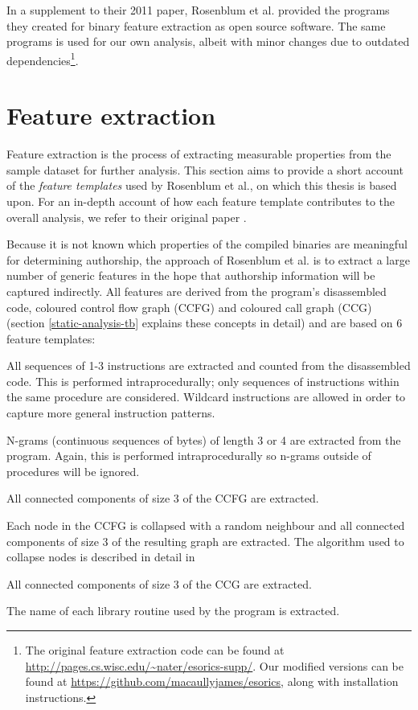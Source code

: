 \documentclass[a4paper,11pt]{kth-mag}
\begin{document}
In a supplement to their 2011 paper, Rosenblum et al. provided the programs
they created for binary feature extraction as open source software. The same programs is used for our own analysis, albeit with minor changes due to
outdated dependencies\footnote{
    The original feature extraction code can be found at
    \url{http://pages.cs.wisc.edu/~nater/esorics-supp/}. Our modified versions
    can be found at \url{https://github.com/macaullyjames/esorics}, along with
    installation instructions.
}.

\section{Feature extraction}
\label{sec:feature-extraction}
Feature extraction is the process of extracting measurable properties from the
sample dataset for further analysis. This section aims to provide a short
account of the \emph{feature templates} used by Rosenblum et al., on which this
thesis is based upon. For an in-depth account of how each feature template contributes
to the overall analysis, we refer to their original paper
\parencite{rosenblum2011wrote}.

Because it is not known which properties of the compiled binaries are
meaningful for determining authorship, the approach of Rosenblum et al. is to
extract a large number of generic features in the hope that authorship
information will be captured indirectly. All features are derived from the
program's disassembled code, coloured control flow graph (CCFG) and coloured
call graph (CCG) (section \ref{static-analysis-tb} explains these concepts in
detail) and are based on 6 feature templates: 

\begin{description}[style=nextline]
\item[Idioms]
All sequences of 1-3 instructions are extracted and counted from the
disassembled code. This is performed intraprocedurally; only sequences of
instructions within the same procedure are considered. Wildcard instructions
are allowed in order to capture more general instruction patterns.

\item[N-grams]
N-grams (continuous sequences of bytes) of length 3 or 4 are extracted from
the program. Again, this is performed intraprocedurally so n-grams outside of
procedures will be ignored.

\item[Graphlets]
All connected components of size 3 of the CCFG are extracted.

\item[Supergraphlets]
Each node in the CCFG is collapsed with a random neighbour and all connected
components of size 3 of the resulting graph are extracted. The algorithm used
to collapse nodes is described in detail in \parencite{rosenblum2011recovering} 

\item[Call graphlets]
All connected components of size 3 of the CCG are extracted.

\item[External interaction]
The name of each library routine used by the program is extracted.
\end{description}
\end{document}
